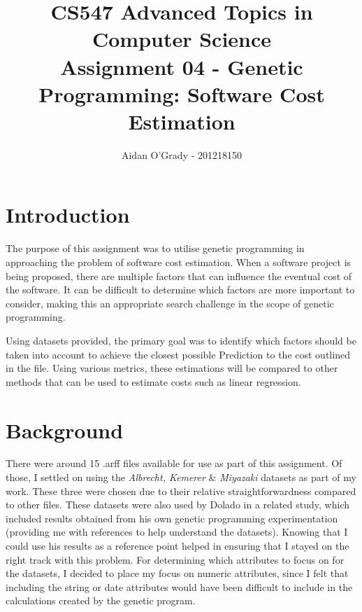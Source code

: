 \documentclass[11pt, a4paper]{article}
\begin{document}
\title{CS547 Advanced Topics in Computer Science\\
\large{Assignment 04 - Genetic Programming: Software Cost Estimation}}
\author{Aidan O'Grady - 201218150}
\date{}
\maketitle
\section{Introduction} %
\label{sec:introduction}
The purpose of this assignment was to utilise genetic programming in approaching
the problem of software cost estimation. When a software project is being
proposed, there are multiple factors that can influence the eventual cost of the
software. It can be difficult to determine which factors are more important to
consider, making this an appropriate search challenge in the scope of genetic
programming.

Using datasets provided, the primary goal was to identify which factors should
be taken into account to achieve the closest possible Prediction to the cost
outlined in the file. Using various metrics, these estimations will be compared
to other methods that can be used to estimate costs such as linear regression.

\section{Background} %
\label{sec:background}
There were around 15 .arff files available for use as part of this assignment.
Of those, I settled on using the \emph{Albrecht, Kemerer} \& \emph{Miyazaki}
datasets as part of my work. These three were chosen due to their relative
straightforwardness compared to other files. These datasets were also used by
Dolado \cite{Dolado200161} in a related study, which included results obtained
from his own genetic programming experimentation (providing me with references
to help understand the datasets). Knowing that I could use his results as a
reference point helped in ensuring that I stayed on the right track with this
problem. For determining which attributes to focus on for the datasets, I
decided to place my focus on numeric attributes, since I felt that including
the string or date attributes would have been difficult to include in the
calculations created by the genetic program.
\end{document}
